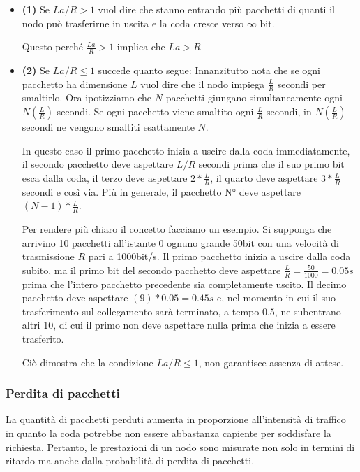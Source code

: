 \documentclass{book}
\begin{document}
\begin{itemize}
	\item \textbf{(1)} Se $La/R > 1$ vuol dire che stanno entrando più pacchetti di quanti il nodo può trasferirne in uscita e la coda cresce verso $\infty$ bit. 
	
	Questo perché $\frac{La}{R} > 1$ implica che $La > R$

	\item \textbf{(2)} Se $La/R \leq 1$ succede quanto segue: Innanzitutto nota che se ogni pacchetto ha dimensione $L$ vuol dire che il nodo impiega $\frac{L}{R}$ secondi per smaltirlo. Ora ipotizziamo che $N$ pacchetti giungano simultaneamente ogni $N(\frac{L}{R})$ secondi. Se ogni pacchetto viene smaltito ogni $\frac{L}{R}$ secondi, in $N(\frac{L}{R})$ secondi ne vengono smaltiti esattamente $N$. 
	
	In questo caso il primo pacchetto inizia a uscire dalla coda immediatamente, il secondo pacchetto deve aspettare $L/R$ secondi prima che il suo primo bit esca dalla coda, il terzo deve aspettare $2 * \frac{L}{R}$, il quarto deve aspettare $3 * \frac{L}{R}$ secondi e così via. Più in generale, il pacchetto N° deve aspettare $(N-1) * \frac{L}{R}$.
	
	Per rendere più chiaro il concetto facciamo un esempio. Si supponga che arrivino 10 pacchetti all'istante 0 ognuno grande 50bit con una velocità di trasmissione $R$ pari a  1000bit/s. Il primo pacchetto inizia a uscire dalla coda subito, ma il primo bit del secondo pacchetto deve aspettare $\frac{L}{R} = \frac{50}{1000} = 0.05s$ prima che l'intero pacchetto precedente sia completamente uscito. Il decimo pacchetto deve aspettare $(9) * 0.05 = 0.45s$ e, nel momento in cui il suo trasferimento sul collegamento sarà terminato, a tempo $0.5$, ne subentrano altri 10, di cui il primo non deve aspettare nulla prima che inizia a essere trasferito.

	Ciò dimostra che la condizione $La/R \leq 1$, non garantisce assenza di attese.

\end{itemize}
	
\subsubsection{Perdita di pacchetti}
La quantità di pacchetti perduti aumenta in proporzione all'intensità di traffico in quanto la coda potrebbe non essere abbastanza capiente per soddisfare la richiesta. Pertanto, le prestazioni di un nodo sono misurate non solo in termini di ritardo ma anche dalla probabilità di perdita di pacchetti.
\end{document}
